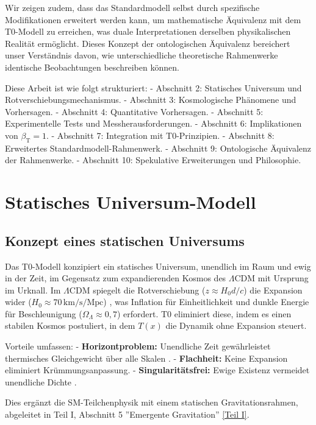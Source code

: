 \documentclass[twocolumn,aps,prl]{revtex4-2}
\newcommand{\Tfield}{T(x)}
\newcommand{\betaT}{\beta_{\text{T}}}
\newcommand{\LCDM}{\Lambda\text{CDM}}
\begin{document}
	Wir zeigen zudem, dass das Standardmodell selbst durch spezifische Modifikationen erweitert werden kann, um mathematische Äquivalenz mit dem T0-Modell zu erreichen, was duale Interpretationen derselben physikalischen Realität ermöglicht. Dieses Konzept der ontologischen Äquivalenz bereichert unser Verständnis davon, wie unterschiedliche theoretische Rahmenwerke identische Beobachtungen beschreiben können.
	
	Diese Arbeit ist wie folgt strukturiert:
	- Abschnitt 2: Statisches Universum und Rotverschiebungsmechanismus.
	- Abschnitt 3: Kosmologische Phänomene und Vorhersagen.
	- Abschnitt 4: Quantitative Vorhersagen.
	- Abschnitt 5: Experimentelle Tests und Messherausforderungen.
	- Abschnitt 6: Implikationen von \(\betaT = 1\).
	- Abschnitt 7: Integration mit T0-Prinzipien.
	- Abschnitt 8: Erweitertes Standardmodell-Rahmenwerk.
	- Abschnitt 9: Ontologische Äquivalenz der Rahmenwerke.
	- Abschnitt 10: Spekulative Erweiterungen und Philosophie.
	
	\section{Statisches Universum-Modell}
	\label{sec:static_universe}
	
	\subsection{Konzept eines statischen Universums}
	\label{subsec:static_concept}
	
	Das T0-Modell konzipiert ein statisches Universum, unendlich im Raum und ewig in der Zeit, im Gegensatz zum expandierenden Kosmos des \(\LCDM\) mit Ursprung im Urknall. Im \(\LCDM\) spiegelt die Rotverschiebung (\(z \approx H_0 d / c\)) die Expansion wider (\(H_0 \approx 70 \, \text{km/s/Mpc}\)) \cite{Planck2020}, was Inflation für Einheitlichkeit und dunkle Energie für Beschleunigung (\(\Omega_{\Lambda} \approx 0,7\)) \cite{Riess1998} erfordert. T0 eliminiert diese, indem es einen stabilen Kosmos postuliert, in dem \(\Tfield\) die Dynamik ohne Expansion steuert.
	
	Vorteile umfassen:
	- \textbf{Horizontproblem:} Unendliche Zeit gewährleistet thermisches Gleichgewicht über alle Skalen \cite{pascher_messdifferenzen_2025}.
	- \textbf{Flachheit:} Keine Expansion eliminiert Krümmungsanpassung.
	- \textbf{Singularitätsfrei:} Ewige Existenz vermeidet unendliche Dichte \cite{pascher_perspective_2025}.
	
	Dies ergänzt die SM-Teilchenphysik mit einem statischen Gravitationsrahmen, abgeleitet in Teil I, Abschnitt 5 ''Emergente Gravitation'' \href{https://github.com/jpascher/T0-Time-Mass-Duality/tree/main/2/pdf/Deutsch/QMRelTimeMassPart1.pdf}{[Teil I]}.
	
\end{document}
